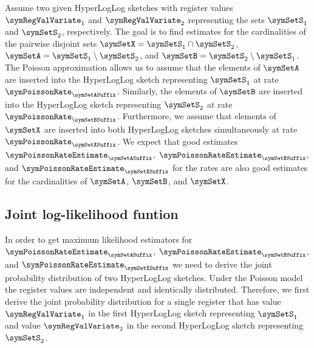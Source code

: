 \documentclass[a4paper]{scrartcl}
\begin{document}
Assume two given  HyperLogLog sketches with register values $\boldsymbol{\symRegValVariate}_1$ and $\boldsymbol{\symRegValVariate}_2$ representing the sets $\symSetS_1$ and $\symSetS_2$, respectively. The goal is to find estimates for the cardinalities of the pairwise disjoint sets $\symSetX = \symSetS_1\cap\symSetS_2$, $\symSetA = \symSetS_1\setminus\symSetS_2$, and $\symSetB = \symSetS_2\setminus\symSetS_1$. The Poisson approximation allows us to assume that the elements of $\symSetA$ are inserted into the HyperLogLog sketch representing $\symSetS_1$ at rate $\symPoissonRate_\symSetASuffix$. Similarly, the elements of $\symSetB$ are inserted into the HyperLogLog sketch representing $\symSetS_2$ at rate $\symPoissonRate_\symSetBSuffix$. Furthermore, we assume that elements of $\symSetX$ are inserted into both HyperLogLog sketches simultaneously at rate $\symPoissonRate_\symSetXSuffix$. We expect that good estimates $\symPoissonRateEstimate_\symSetASuffix$, $\symPoissonRateEstimate_\symSetBSuffix$, and $\symPoissonRateEstimate_\symSetXSuffix$ for the rates are also good estimates for the cardinalities of $\symSetA$, $\symSetB$, and $\symSetX$. 

\subsection{Joint log-likelihood funtion}
In order to get maximum likelihood estimators for $\symPoissonRateEstimate_\symSetASuffix$, $\symPoissonRateEstimate_\symSetBSuffix$, and $\symPoissonRateEstimate_\symSetXSuffix$ we need to derive the joint probability distribution of two HyperLogLog sketches. Under the Poisson model the register values are independent and identically distributed. Therefore, we first derive the joint probability distribution for a single register that has value $\symRegValVariate_1$ in the first HyperLogLog sketch representing $\symSetS_1$ and value $\symRegValVariate_2$ in the second HyperLogLog sketch representing $\symSetS_2$. 
\end{document}
